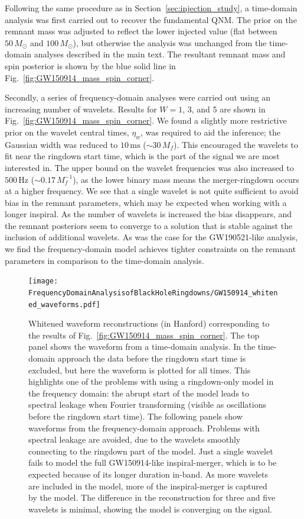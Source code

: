 Following the same procedure as in Section~\ref{sec:injection_study}, a time-domain analysis was first carried out to recover the fundamental QNM. 
The prior on the remnant mass was adjusted to reflect the lower injected value (flat between $50\,M_\odot$ and $100\,M_\odot$), but otherwise the analysis was unchanged from the time-domain analyses described in the main text.
The resultant remnant mass and spin posterior is shown by the blue solid line in Fig.~\ref{fig:GW150914_mass_spin_corner}.

Secondly, a series of frequency-domain analyses were carried out using an increasing number of wavelets.
Results for $W=1$, 3, and 5 are shown in Fig.~\ref{fig:GW150914_mass_spin_corner}.
We found a slightly more restrictive prior on the wavelet central times, $\eta_w$, was required to aid the inference; the Gaussian width was reduced to $10\,\mathrm{ms}$ ($\sim 30\,M_f$).
This encouraged the wavelets to fit near the ringdown start time, which is the part of the signal we are most interested in.
The upper bound on the wavelet frequencies was also increased to $500\,\mathrm{Hz}$ ($\sim 0.17\,M_f^{-1}$), as the lower binary mass means the merger-ringdown occurs at a higher frequency.
We see that a single wavelet is not quite sufficient to avoid bias in the remnant parameters, which may be expected when working with a longer inspiral.
As the number of wavelets is increased the bias disappears, and the remnant posteriors seem to converge to a solution that is stable against the inclusion of additional wavelets. 
As was the case for the GW190521-like analysis, we find the frequency-domain model achieves tighter constraints on the remnant parameters in comparison to the time-domain analysis. 

\begin{figure}[t!]
    \centering
    \texttt{[image: FrequencyDomainAnalysisofBlackHoleRingdowns/GW150914\_whitened\_waveforms.pdf]}
    \caption[Whitened waveform reconstructions for the same analyses as in Fig.~\ref{fig:GW150914_mass_spin_corner}]{ 
    Whitened waveform reconstructions (in Hanford) corresponding to the results of Fig.~\ref{fig:GW150914_mass_spin_corner}. 
    The top panel shows the waveform from a time-domain analysis. 
    In the time-domain approach the data before the ringdown start time is excluded, but here the waveform is plotted for all times.
    This highlights one of the problems with using a ringdown-only model in the frequency domain: the abrupt start of the model leads to spectral leakage when Fourier transforming (visible as oscillations before the ringdown start time).
    The following panels show waveforms from the frequency-domain approach.
    Problems with spectral leakage are avoided, due to the wavelets smoothly connecting to the ringdown part of the model.
    Just a single wavelet fails to model the full GW150914-like inspiral-merger, which is to be expected because of its longer duration in-band.
    As more wavelets are included in the model, more of the inspiral-merger is captured by the model.
    The difference in the reconstruction for three and five wavelets is minimal, showing the model is converging on the signal.
    }
    \label{fig:GW150914_whitened_waveforms}
\end{figure}

